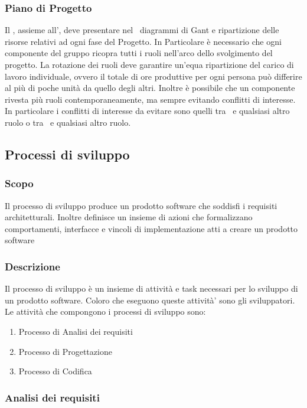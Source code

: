 \documentclass[12pt,a4paper]{article}
\begin{document}
\subsubsection{Piano di Progetto} %
Il \PM, assieme all'\AM, deve presentare nel \PdP\ diagrammi di Gant e ripartizione delle risorse relativi ad ogni fase del Progetto. In Particolare è necessario che ogni componente del gruppo ricopra tutti i ruoli nell'arco dello svolgimento del progetto. La rotazione dei ruoli deve garantire un'equa ripartizione del carico di lavoro individuale, ovvero il totale di ore produttive per ogni persona può differire al più di poche unità da quello degli altri. Inoltre è possibile che un componente rivesta più ruoli contemporaneamente, ma sempre evitando conflitti di interesse. In particolare i conflitti di interesse da evitare sono quelli tra \PM\ e qualsiasi altro ruolo o tra \VR\ e qualsiasi altro ruolo.

\subsection{Processi di sviluppo}

\subsubsection{Scopo}
Il processo di sviluppo produce un prodotto software che soddisfi i requisiti architetturali. Inoltre definisce un insieme di azioni che formalizzano comportamenti, interfacce e vincoli di implementazione atti a creare un prodotto software

\subsubsection{Descrizione}
Il processo di sviluppo è un insieme di attività e task necessari per lo sviluppo di un prodotto software. Coloro che eseguono queste attività’ sono gli sviluppatori. Le attività che compongono i processi di sviluppo sono:
\begin{enumerate}
\item Processo di Analisi dei requisiti
\item Processo di Progettazione
\item Processo di Codifica
\end{enumerate}

\subsubsection{Analisi dei requisiti} %
\end{document}
